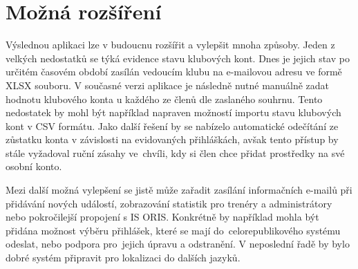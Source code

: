 \section{Možná rozšíření}

Výslednou aplikaci lze v budoucnu rozšířit a vylepšit mnoha způsoby. Jeden z velkých nedostatků se týká evidence stavu klubových kont. Dnes je jejich stav po určitém časovém období zasílán vedoucím klubu na e-mailovou adresu ve formě XLSX souboru. V současné verzi aplikace je následně nutné manuálně zadat hodnotu klubového konta u každého ze členů dle zaslaného souhrnu. Tento nedostatek by mohl být například napraven možností importu stavu klubových kont v CSV formátu. Jako další řešení by se nabízelo automatické odečítání ze zůstatku konta v závislosti na evidovaných přihláškách, avšak tento přístup by stále vyžadoval ruční zásahy ve~chvíli, kdy si člen chce přidat prostředky na své osobní konto.

Mezi další možná vylepšení se jistě může zařadit zasílání informačních e-mailů při přidávání nových událostí, zobrazování statistik pro trenéry a administrátory nebo pokročilejší propojení s IS ORIS. Konkrétně by například mohla být přidána možnost výběru přihlášek, které se mají do~celorepublikového systému odeslat, nebo podpora pro~jejich úpravu a odstranění. V neposlední řadě by bylo dobré systém připravit pro lokalizaci do dalších jazyků.
